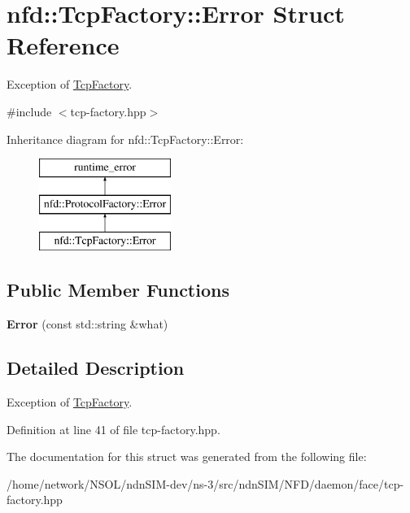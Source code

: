 \hypertarget{structnfd_1_1TcpFactory_1_1Error}{}\section{nfd\+:\+:Tcp\+Factory\+:\+:Error Struct Reference}
\label{structnfd_1_1TcpFactory_1_1Error}


Exception of \hyperlink{classnfd_1_1TcpFactory}{Tcp\+Factory}.  




{\ttfamily \#include $<$tcp-\/factory.\+hpp$>$}

Inheritance diagram for nfd\+:\+:Tcp\+Factory\+:\+:Error\+:\begin{figure}[H]
\begin{center}
\leavevmode
\includegraphics[height=3.000000cm]{structnfd_1_1TcpFactory_1_1Error}
\end{center}
\end{figure}
\subsection*{Public Member Functions}
\begin{DoxyCompactItemize}
\item 
{\bfseries Error} (const std\+::string \&what)\hypertarget{structnfd_1_1TcpFactory_1_1Error_ab01f96ad39bd2836c3f7aa2e8bc3af5a}{}\label{structnfd_1_1TcpFactory_1_1Error_ab01f96ad39bd2836c3f7aa2e8bc3af5a}

\end{DoxyCompactItemize}


\subsection{Detailed Description}
Exception of \hyperlink{classnfd_1_1TcpFactory}{Tcp\+Factory}. 

Definition at line 41 of file tcp-\/factory.\+hpp.



The documentation for this struct was generated from the following file\+:\begin{DoxyCompactItemize}
\item 
/home/network/\+N\+S\+O\+L/ndn\+S\+I\+M-\/dev/ns-\/3/src/ndn\+S\+I\+M/\+N\+F\+D/daemon/face/tcp-\/factory.\+hpp\end{DoxyCompactItemize}
